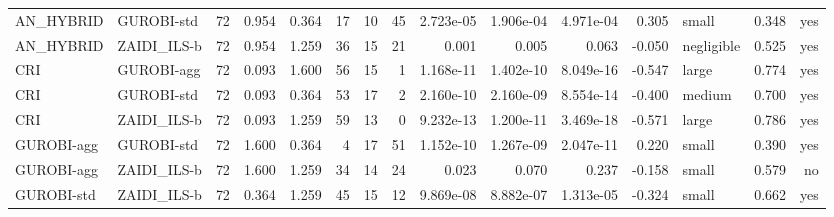 \begin{table}[htbp]
\begin{tabular}{llrrrrrrrrrrlrr}
AN\_HYBRID & GUROBI-std & 72 & 0.954 & 0.364 & 17 & 10 & 45 & 2.723e-05 & 1.906e-04 & 4.971e-04 & 0.305 & small & 0.348 & yes \\
AN\_HYBRID & ZAIDI\_ILS-b & 72 & 0.954 & 1.259 & 36 & 15 & 21 & 0.001 & 0.005 & 0.063 & -0.050 & negligible & 0.525 & yes \\
CRI & GUROBI-agg & 72 & 0.093 & 1.600 & 56 & 15 & 1 & 1.168e-11 & 1.402e-10 & 8.049e-16 & -0.547 & large & 0.774 & yes \\
CRI & GUROBI-std & 72 & 0.093 & 0.364 & 53 & 17 & 2 & 2.160e-10 & 2.160e-09 & 8.554e-14 & -0.400 & medium & 0.700 & yes \\
CRI & ZAIDI\_ILS-b & 72 & 0.093 & 1.259 & 59 & 13 & 0 & 9.232e-13 & 1.200e-11 & 3.469e-18 & -0.571 & large & 0.786 & yes \\
GUROBI-agg & GUROBI-std & 72 & 1.600 & 0.364 & 4 & 17 & 51 & 1.152e-10 & 1.267e-09 & 2.047e-11 & 0.220 & small & 0.390 & yes \\
GUROBI-agg & ZAIDI\_ILS-b & 72 & 1.600 & 1.259 & 34 & 14 & 24 & 0.023 & 0.070 & 0.237 & -0.158 & small & 0.579 & no \\
GUROBI-std & ZAIDI\_ILS-b & 72 & 0.364 & 1.259 & 45 & 15 & 12 & 9.869e-08 & 8.882e-07 & 1.313e-05 & -0.324 & small & 0.662 & yes \\
\bottomrule
\end{tabular}
\end{table}
